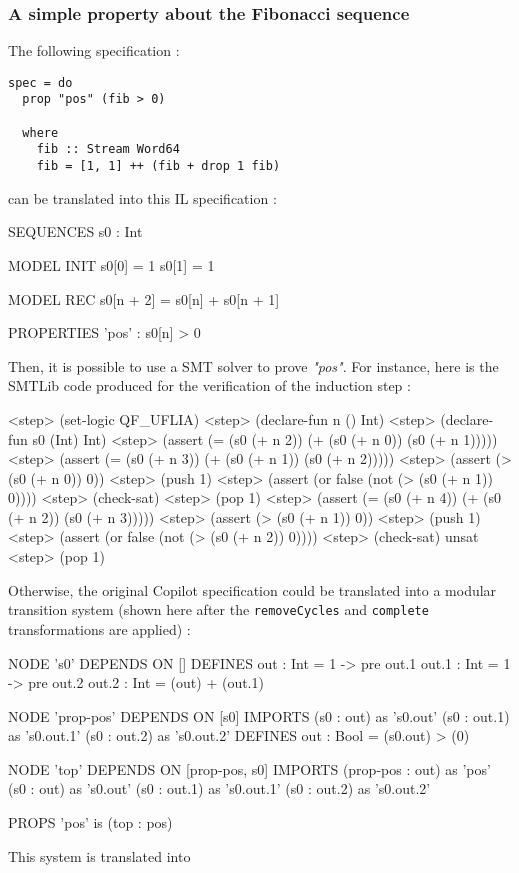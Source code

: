 \subsubsection{A simple property about the Fibonacci sequence}

The following specification :

\begin{lstlisting}[frame=single]
spec = do
  prop "pos" (fib > 0)

  where
    fib :: Stream Word64
    fib = [1, 1] ++ (fib + drop 1 fib)
\end{lstlisting}
can be translated into this IL specification :
\begin{code}
SEQUENCES
    s0 : Int

MODEL INIT
    s0[0] = 1
    s0[1] = 1

MODEL REC
    s0[n + 2] = s0[n] + s0[n + 1]

PROPERTIES
    'pos' : s0[n] > 0
\end{code}
Then, it is possible to use a SMT solver to prove \textit{"pos"}. For instance, here is the SMTLib code produced for the verification of the induction step :
\begin{code}
<step>  (set-logic QF_UFLIA)
<step>  (declare-fun n () Int)
<step>  (declare-fun s0 (Int) Int)
<step>  (assert (= (s0 (+ n 2)) (+ (s0 (+ n 0)) (s0 (+ n 1)))))
<step>  (assert (= (s0 (+ n 3)) (+ (s0 (+ n 1)) (s0 (+ n 2)))))
<step>  (assert (> (s0 (+ n 0)) 0))
<step>  (push 1)
<step>  (assert (or false (not (> (s0 (+ n 1)) 0))))
<step>  (check-sat)
<step>  (pop 1)
<step>  (assert (= (s0 (+ n 4)) (+ (s0 (+ n 2)) (s0 (+ n 3)))))
<step>  (assert (> (s0 (+ n 1)) 0))
<step>  (push 1)
<step>  (assert (or false (not (> (s0 (+ n 2)) 0))))
<step>  (check-sat)
unsat
<step>  (pop 1)
\end{code}

\bigskip

Otherwise, the original Copilot specification could be translated into a modular transition system (shown here after the \texttt{removeCycles} and \texttt{complete} transformations are applied) :
\begin{code}
NODE 's0' DEPENDS ON []
DEFINES
    out : Int =
        1 -> pre out.1
    out.1 : Int =
        1 -> pre out.2
    out.2 : Int =
        (out) + (out.1)

NODE 'prop-pos' DEPENDS ON [s0]
IMPORTS
    (s0 : out) as 's0.out'
    (s0 : out.1) as 's0.out.1'
    (s0 : out.2) as 's0.out.2'
DEFINES
    out : Bool =
        (s0.out) > (0)

NODE 'top' DEPENDS ON [prop-pos, s0]
IMPORTS
    (prop-pos : out) as 'pos'
    (s0 : out) as 's0.out'
    (s0 : out.1) as 's0.out.1'
    (s0 : out.2) as 's0.out.2'

PROPS
'pos' is (top : pos)
\end{code}
This system is translated into 

